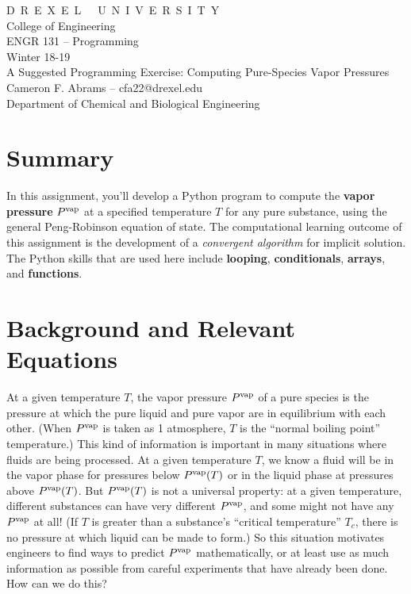 \documentclass[11pt]{article}
\newif \ifshowsolutions
\begin{document}
\begin{centering}
{\sc D\ R\ E\ X\ E\ L\ \ \ U\ N\ I\ V\ E\ R\ S\ I\ T\ Y}\\
College of Engineering\\
ENGR 131 -- Programming \\
Winter 18-19\\
A Suggested Programming Exercise:  Computing Pure-Species Vapor Pressures\\
Cameron F. Abrams -- cfa22@drexel.edu\\
Department of Chemical and Biological Engineering\\
\ifshowsolutions
\textcolor{blue}{S\ O\ L\ U\ T\ I\ O\ N\ S}\\
\fi
\end{centering}

\section*{Summary}
In this assignment, you'll develop a Python program to compute the {\bf vapor pressure} $P^{\rm vap}$ at a specified temperature $T$ for any pure substance, using the general Peng-Robinson equation of state.  The computational learning outcome of this assignment is the development of a {\em convergent algorithm} for implicit solution.  The Python skills that are used here include {\bf looping}, {\bf conditionals}, {\bf arrays}, and {\bf functions}.

\section*{Background and Relevant Equations}
At a given temperature $T$, the vapor pressure $P^{\rm vap}$ of a pure species is the pressure at which the pure liquid and pure vapor are in equilibrium with each other.  (When $P^{\rm vap}$ is taken as 1 atmosphere, $T$ is the ``normal boiling point'' temperature.)  This kind of information is important in many situations where fluids are being processed.  At a given temperature $T$, we know a fluid will be in the vapor phase for pressures below $P^{\rm vap}(T)$ or in the liquid phase at pressures above $P^{\rm vap}(T)$.  But $P^{\rm vap}(T)$ is not a universal property: at a given temperature, different substances can have very different $P^{\rm vap}$, and some might not have any $P^{\rm vap}$ at all!  (If $T$ is greater than a substance's ``critical temperature'' $T_c$, there is no pressure at which liquid can be made to form.)  So this situation motivates engineers to find ways to predict $P^{\rm vap}$ mathematically, or at least use as much information as possible from careful experiments that have already been done.  How can we do this?
\end{document}
